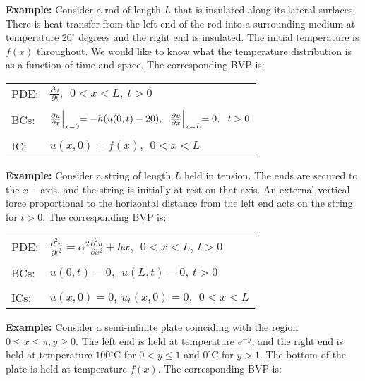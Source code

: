 \noindent\textbf{Example: } Consider a rod of length $L$ that is insulated along its lateral surfaces.  There is heat transfer from the left end of the rod into a surrounding medium at temperature $20^{\circ}$ degrees and the right end is insulated.  The initial temperature is $f(x)$ throughout.  We would like to know what the temperature distribution is as a function of time and space.  The corresponding BVP is:
\begin{table}
\begin{tabular}{l l}
PDE: & $\frac{\partial u}{\partial t}, \ \ 0<x<L, \ t>0 $ \\
& \\
BCs: & $\frac{\partial u}{\partial x}\Bigl|_{x=0} = -h(u(0,t)-20), \ \  \frac{\partial u}{\partial x}\Bigl|_{x=L} = 0, \ \ t>0$ \\
& \\
IC: & $u(x,0) = f(x), \ \ 0<x<L$ \\
\end{tabular}
\end{table}

\vspace{0.5cm}

\noindent\textbf{Example: } Consider a string of length $L$ held in tension.  The ends are secured to the $x-$axis, and the string is initially at rest on that axis.  An external vertical force proportional to the horizontal distance from the left end acts on the string for $t>0$.  The corresponding BVP is:
\begin{table}
\begin{tabular}{l l}
PDE: & $\frac{\partial^2 u}{\partial t^2} = \alpha^2 \frac{\partial^2 u}{\partial x^2} + hx, \ \ 0<x<L, \ t>0 $ \\
& \\
BCs: & $u(0,t)=0, \ \ u(L,t) = 0, \ t>0 $ \\
& \\
ICs: & $u(x,0) = 0, \ u_t(x,0) = 0, \ \ 0<x<L$ \\
\end{tabular}
\end{table}

\vspace{0.5cm}

\noindent\textbf{Example: } Consider a semi-infinite plate coinciding with the region $0 \le x \le \pi, y\ge 0.$  The left end is held at temperature $e^{-y}$, and the right end is held at temperature $100^{\circ}$C for $0 < y \le 1$ and $0^{\circ}$C for $y>1$.  The bottom of the plate is held at temperature $f(x)$.  The corresponding BVP is:

